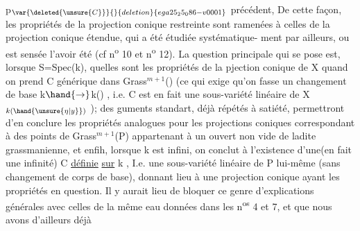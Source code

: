 
p$_{\var{\deleted{\unsure{C}}}{}{deletion}{ega25_25_086-v0001}}$ précédent, 
 De cette façon, les propriétés de
la projection conique  restreinte  sont ramenées  à
celles de la projection conique étendue, qui a été  étudiée systématique-%
ment par ailleurs, ou est sensée l'avoir été (cf n\textsuperscript{o} 10 et n\textsuperscript{o} 12). La
question principale qui se pose est, lorsque  S=Spec(k), quelles sont
les propriétés de la pjection conique  de X  quand on prend C générique
dans Grass$^{m+1}$() (ce qui exige  qu'on fasse un changement de base
k$\hand{\rightarrow}$k() , i.e.  C est  en fait une sous-variété linéaire de X$_{k(\hand{\unsure{\eta|y}})}$ ); des
guments  standart, déjà répétés à satiété, permettront d'en conclure
les propriétés analogues pour les projections coniques correspondant à 
des points de Grass$^{m+1}$(P)  appartenant à un ouvert non vide de ladite
grassmanienne, et enfih, lorsque k est infini, on conclut à l'existence
d'une(en fait une infinité)   C  \uline{définie} \uline{sur} k , I.e.  une sous-variété
linéaire de P lui-même (sans changement de corps de base), donnant lieu
à une projection conique ayant les propriétés en question. Il y aurait
 lieu de bloquer ce genre d'explications générales avec celles de la même
eau données dans les n\textsuperscript{os} 4 et 7, et que nous avons d'ailleurs déjà

